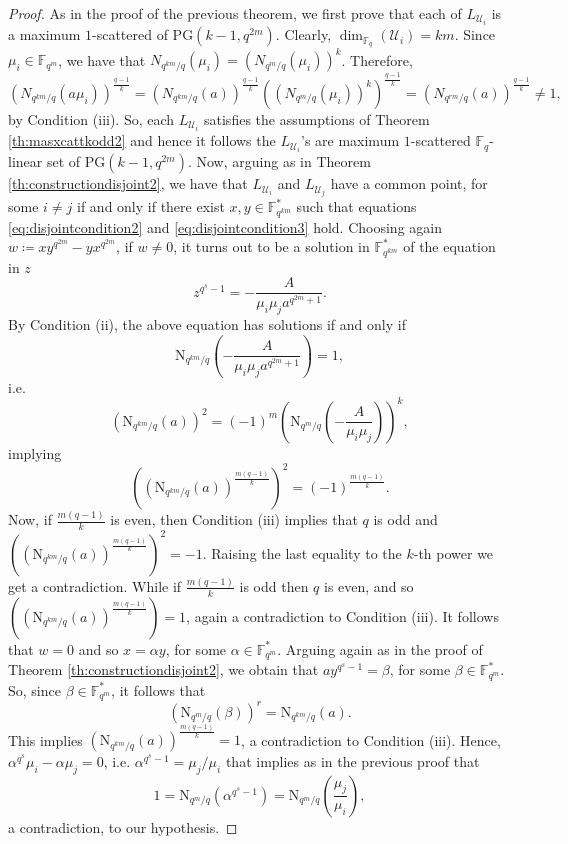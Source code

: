 \documentclass[11pt]{amsart}
\theoremstyle{definition}
\newcommand{\F}{{\mathbb F}}
\newcommand{\U}{{\mathcal{U}}}
\newcommand{\PG}{\mathrm{PG}}
\newcommand{\N}{\mathrm{N}}
\begin{document}
{\begin{proof}
As in the proof of the previous theorem, we first prove that each of $L_{\U_i}$ is a maximum $1$-scattered of $\PG(k-1,q^{2m})$. Clearly, $\dim_{\F_q}(\U_i)=km$. Since $\mu_i \in \F_{q^m}$, we have that $N_{q^{km}/q}(\mu_i)=(N_{q^{m}/q}(\mu_i))^k$. Therefore,
\[
(N_{q^{km}/q}(a\mu_i))^{\frac{q-1}{k}}=(N_{q^{km}/q}(a))^{\frac{q-1}{k}}((N_{q^{m}/q}(\mu_i))^k)^{\frac{q-1}{k}}=(N_{q^{rm}/q}(a))^{\frac{q-1}{k}} \neq 1,\]
by Condition (iii). So, each $L_{\U_i}$ satisfies the assumptions of Theorem \ref{th:masxcattkodd2} and hence it follows the $L_{\U_i}$'s are maximum $1$-scattered $\F_q$-linear set of $\PG(k-1,q^{2m})$. \newline
Now, arguing as in Theorem \ref{th:constructiondisjoint2}, we have that $L_{\U_i}$ and $L_{\U_j}$ have a common point, for some $i \neq j$ if and only if there exist $x,y \in \F_{q^{km}}^*$ such that equations \eqref{eq:disjointcondition2} and \eqref{eq:disjointcondition3} hold. Choosing again $w \coloneqq xy^{q^{2m}}-yx^{q^{2m}}$, if $w \neq 0$, it turns out to be a solution in $\F_{q^{km}}^*$ of the equation in $z$
\[
z^{q^s-1}=-\frac{A}{\mu_i\mu_ja^{q^{2m}+1}}.
\]
By Condition (ii), the above equation has solutions if and only if 
\[
\N_{q^{km}/q} \left( -\frac{A}{\mu_i\mu_ja^{q^{2m}+1}} \right)=1,
\]
i.e.
\[
(\N_{q^{km}/q} \left( a \right))^{2}=(-1)^m\left(\N_{q^{m}/q} \left( -\frac{A}{\mu_i\mu_j} \right)\right)^k,
\]
implying
\[
\left((\N_{q^{km}/q} \left( a \right))^{\frac{m(q-1)}{k}}\right)^{2}=(-1)^{\frac{m(q-1)}{k}}.
\]
Now, if $\frac{m(q-1)}{k}$ is even, then Condition (iii) implies that $q$ is odd and $\left((\N_{q^{km}/q} \left( a \right))^{\frac{m(q-1)}{k}}\right)^2=-1$. Raising the last equality to the $k$-th power we get a contradiction. While if $\frac{m(q-1)}{k}$ is odd then $q$ is even, and so $\left((\N_{q^{km}/q} \left( a \right))^{\frac{m(q-1)}{k}}\right)=1$, again a contradiction to Condition (iii). It follows that $w=0$ and so $x=\alpha y$, for some $\alpha \in \F_{q^m}^*$. Arguing again as in the proof of Theorem \ref{th:constructiondisjoint2}, we obtain that $ay^{q^s-1}=\beta$, for some $\beta \in \F_{q^m}^*$. So, since $\beta \in \F_{q^m}^*$, it follows that 
\[
(\N_{q^{m}/q}(\beta))^r=\N_{q^{km}/q}(a).
\]
This implies $(\N_{q^{km}/q}(a))^{\frac{m(q-1)}{k}}=1$, a contradiction to Condition (iii). Hence, $\alpha^{q^s}\mu_i-\alpha \mu_j = 0$, i.e. $\alpha^{q^s-1}=\mu_j/\mu_i$ that implies as in the previous proof that 
\[
1=\N_{q^{m}/q}(\alpha^{q^s-1})=\N_{q^{m}/q}\left(\frac{\mu_j}{\mu_i}\right),
\]
a contradiction, to our hypothesis.


\end{proof}}
\end{document}
